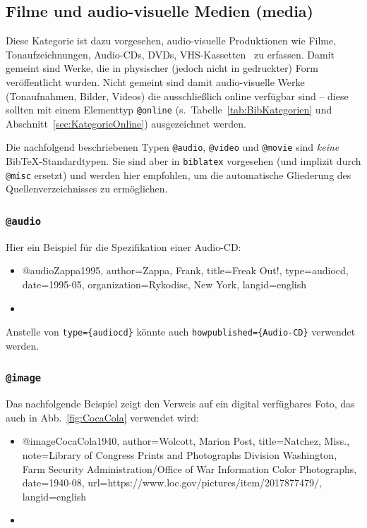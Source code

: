 \subsection{Filme und audio-visuelle Medien (\textsf{media})}
\label{sec:KategorieAvmedia}

Diese Kategorie ist dazu vorgesehen, audio-visuelle Produktionen wie Filme,
Tonaufzeichnungen, Audio-CDs, DVDs, VHS-Kassetten \usw\ zu erfassen. Damit
gemeint sind Werke, die in physischer (jedoch nicht in gedruckter) Form
veröffentlicht wurden. Nicht gemeint sind damit audio-visuelle Werke
(Tonaufnahmen, Bilder, Videos) die ausschließlich online verfügbar sind --
diese sollten mit einem Elementtyp \texttt{@online} (s.\
Tabelle~\ref{tab:BibKategorien} und Abschnitt~\ref{sec:KategorieOnline})
ausgezeichnet werden.

Die nachfolgend beschriebenen Typen \texttt{@audio}, \texttt{@video} und
\texttt{@movie} sind \emph{keine} Bib\-TeX-Standardtypen. Sie sind aber in
\texttt{biblatex} vorgesehen (und implizit durch \texttt{@misc} ersetzt) und
werden hier empfohlen, um die automatische Gliederung des
Quellenverzeichnisses zu ermöglichen.

\subsubsection{\texttt{\bfseries @audio}}
\label{sec:@audio}
Hier ein Beispiel für die Spezifikation einer Audio-CD:
%
\begin{itemize}
\item[]
\begin{GenericCode}[numbers=none]
@audio{Zappa1995,
  author={Zappa, Frank},
  title={Freak Out!},
  type={audiocd},
  date={1995-05},
  organization={Rykodisc, New York},
  langid={english}
}
\end{GenericCode}
\item[\cite{Zappa1995}] 
\end{itemize}
%
Anstelle von \verb!type={audiocd}! könnte auch \verb!howpublished={Audio-CD}!
verwendet werden.

\subsubsection{\texttt{\bfseries @image}}
\label{sec:@image}

Das nachfolgende Beispiel zeigt den Verweis auf ein digital verfügbares Foto,
das auch in Abb.\ \ref{fig:CocaCola} verwendet wird:
%
\begin{itemize}
\item[]
\begin{GenericCode}[numbers=none]
@image{CocaCola1940,
  author={Wolcott, Marion Post},
  title={Natchez, Miss.},
  note={Library of Congress Prints and Photographs Division Washington, Farm Security Administration/Office of War Information Color Photographs},
  date={1940-08},
  url={https://www.loc.gov/pictures/item/2017877479/},
  langid={english}
}
\end{GenericCode}
\item[\cite{CocaCola1940}] 
\end{itemize}

